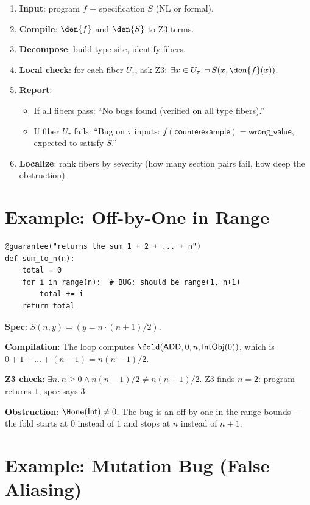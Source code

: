 \begin{enumerate}
  \item \textbf{Input}: program $f$ + specification $S$ (NL or formal).
  \item \textbf{Compile}: $\den{f}$ and $\den{S}$ to Z3 terms.
  \item \textbf{Decompose}: build type site, identify fibers.
  \item \textbf{Local check}: for each fiber $U_\tau$, ask Z3:
    $\exists x \in U_\tau.\, \lnot\,S(x, \den{f}(x))$.
  \item \textbf{Report}:
    \begin{itemize}
      \item If all fibers pass: ``No bugs found (verified on all
        type fibers).''
      \item If fiber $U_\tau$ fails: ``Bug on $\tau$ inputs:
        $f(\mathsf{counterexample}) = \mathsf{wrong\_value}$,
        expected to satisfy $S$.''
    \end{itemize}
  \item \textbf{Localize}: rank fibers by severity (how many section
    pairs fail, how deep the obstruction).
\end{enumerate}

\section{Example: Off-by-One in Range}

\begin{lstlisting}[caption={Sum with off-by-one}]
@guarantee("returns the sum 1 + 2 + ... + n")
def sum_to_n(n):
    total = 0
    for i in range(n):  # BUG: should be range(1, n+1)
        total += i
    return total
\end{lstlisting}

\textbf{Spec}: $S(n, y) = (y = n \cdot (n+1) / 2)$.

\textbf{Compilation}: The loop computes $\fold(\mathsf{ADD}, 0, n,
\mathsf{IntObj}(0))$, which is $0 + 1 + \ldots + (n-1) =
n(n-1)/2$.

\textbf{Z3 check}: $\exists n.\, n \geq 0 \land n(n-1)/2 \neq
n(n+1)/2$.  Z3 finds $n = 2$: program returns $1$, spec says $3$.

\textbf{Obstruction}: $\Hone(\mathsf{Int}) \neq 0$.  The bug is
an off-by-one in the range bounds --- the fold starts at $0$
instead of $1$ and stops at $n$ instead of $n+1$.

\section{Example: Mutation Bug (False Aliasing)}

